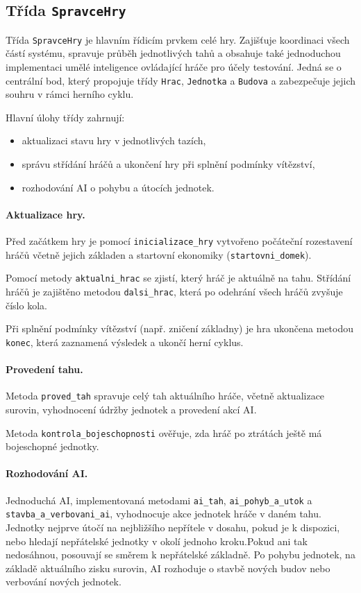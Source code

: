 \subsection{Třída \texttt{SpravceHry}}

Třída \texttt{SpravceHry} je hlavním řídicím prvkem celé hry. Zajišťuje koordinaci všech částí systému, spravuje průběh jednotlivých tahů a obsahuje také jednoduchou implementaci umělé inteligence ovládající hráče pro účely testování. Jedná se o centrální bod, který propojuje třídy \texttt{Hrac}, \texttt{Jednotka} a \texttt{Budova} a zabezpečuje jejich souhru v rámci herního cyklu.

Hlavní úlohy třídy zahrnují: 
\begin{itemize} 
    \item aktualizaci stavu hry v jednotlivých tazích, 
    \item správu střídání hráčů a ukončení hry při splnění podmínky vítězství, 
    \item rozhodování AI o pohybu a útocích jednotek. 
\end{itemize}

\paragraph{Aktualizace hry.}
Před začátkem hry je pomocí \texttt{inicializace\_hry} vytvořeno počáteční rozestavení hráčů včetně jejich základen a startovní ekonomiky (\texttt{startovni\_domek}).

Pomocí metody \texttt{aktualni\_hrac} se zjistí, který hráč je aktuálně na tahu. Střídání hráčů je zajištěno metodou \texttt{dalsi\_hrac}, která po odehrání všech hráčů zvyšuje číslo kola.

Při splnění podmínky vítězství (např. zničení základny) je hra ukončena metodou \texttt{konec}, která zaznamená výsledek a ukončí herní cyklus.

\paragraph{Provedení tahu.}
Metoda \texttt{proved\_tah} spravuje celý tah aktuálního hráče, včetně aktualizace surovin, vyhodnocení údržby jednotek a provedení akcí AI.

Metoda \texttt{kontrola\_bojeschopnosti} ověřuje, zda hráč po ztrátách ještě má bojeschopné jednotky.

\paragraph{Rozhodování AI.}  
Jednoduchá AI, implementovaná metodami \texttt{ai\_tah}, \texttt{ai\_pohyb\_a\_utok} a \texttt{stavba\_a\_verbovani\_ai}, vyhodnocuje akce jednotek hráče v daném tahu. Jednotky nejprve útočí na nejbližšího nepřítele v dosahu, pokud je k dispozici, nebo hledají nepřátelské jednotky v okolí jednoho kroku.Pokud ani tak nedosáhnou, posouvají se směrem k nepřátelské základně. Po pohybu jednotek, na základě aktuálního zisku surovin, AI rozhoduje o stavbě nových budov nebo verbování nových jednotek.


